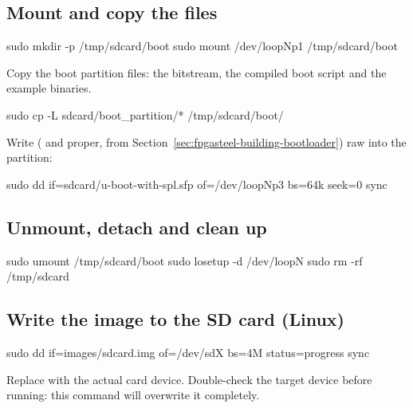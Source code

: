 \subsection{Mount and copy the files}
\label{subsec:fpgasteel-mount-copy}

\begin{shellcodehost}
sudo mkdir -p /tmp/sdcard/boot
sudo mount /dev/loopNp1 /tmp/sdcard/boot
\end{shellcodehost}

Copy the boot partition files: the bitstream, the compiled boot script and the example binaries.

\begin{shellcodehost}
sudo cp -L sdcard/boot_partition/* /tmp/sdcard/boot/
\end{shellcodehost}

Write  ( and  proper, from Section~\ref{sec:fpgasteel-building-bootloader}) raw into the  partition:

\begin{shellcodehost}
sudo dd if=sdcard/u-boot-with-spl.sfp of=/dev/loopNp3 bs=64k seek=0
sync
\end{shellcodehost}

\subsection{Unmount, detach and clean up}
\label{subsec:fpgasteel-unmount-detach}

\begin{shellcodehost}
sudo umount /tmp/sdcard/boot
sudo losetup -d /dev/loopN
sudo rm -rf /tmp/sdcard
\end{shellcodehost}

\subsection{Write the image to the SD card (Linux)}
\label{subsec:fpgasteel-write-sd}

\begin{shellcodehost}
sudo dd if=images/sdcard.img of=/dev/sdX bs=4M status=progress
sync
\end{shellcodehost}

Replace  with the actual  card device. Double-check the target device before running: this command will overwrite it completely.
